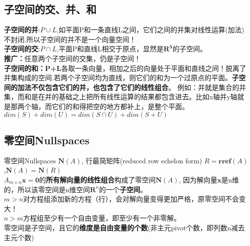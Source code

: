     \subsection{子空间的交、并、和}
    \textbf{子空间的并}:$P\cup L$,如平面P和一条直线L之间，它们之间的并集对线性运算(加法)不封闭.所以子空间的并不是一个向量空间！
    \\
    \textbf{子空间的交}:$P\cap L$,平面P和直线L相交于原点，显然是$\bm{R^3}$的子空间。\\
    \textbf{推广：}任意两个子空间的交集，仍是子空间！\\
    \textbf{子空间的和：P+L}各取一条向量，相加之后的向量处于平面和直线之间！脱离了并集构成的空间.若两个子空间均为直线，则它们的和为一个过原点的平面。\textbf{子空间的加法不仅包含它们的并，也包含了它们的线性组合}。
    例如：并就是集合的并集，而和是在并的基础之上把所有线性运算的结果都包含进去。比如x轴并y轴就是那两个轴，而它们的和得把空的地方都补上，是整个平面。
    \\
    $dim(S)+dim(U) = dim(S\cap U) + dim(S+U)$
    \subsection{零空间Nullspaces}
    零空间Nullspaces $\bm{N}(A)$, 行最简矩阵(reduced row echelon form) $R = \bm{rref}(A)$
    ,$\bm{N}(A)=\bm{N}(R)$
    \\
    $A_{m\times n}\bm{x}=\bm{0}$的\textbf{所有解向量的线性组合}构成了零空间$\bm{N}(A)$, 因为解向量$\bm{x}$是n维的，所以该零空间是n维空间$\bm{R}^n$的一个\textbf{子空间}。
    \\
    $m>n$对方程组添加新的方程（行），会对解向量变得更加严格，原零空间不会变大！\\
    $n>m$方程组至少有一个自由变量，即至少有一个非零解。\\
    零空间是子空间，且它的\textbf{维度是自由变量的个数}(非主元pivot个数，即列数n减去主元个数)

